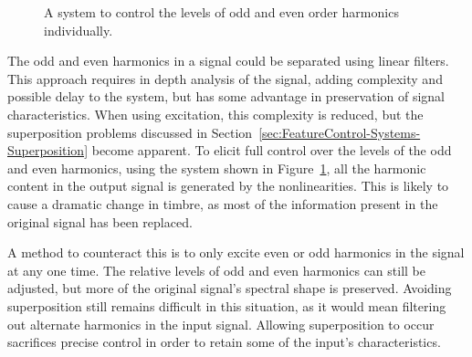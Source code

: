 \begin{figure}[h!]
			\caption{A system to control the levels of odd and even order harmonics individually.}
			\label{fig:HarmonicParitySystem}
		\end{figure}

		The odd and even harmonics in a signal could be separated using linear filters. This approach requires in
		depth analysis of the signal, adding complexity and possible delay to the system, but has some advantage in
		preservation of signal characteristics. When using excitation, this complexity is reduced, but the
		superposition problems discussed in Section~\ref{sec:FeatureControl-Systems-Superposition} become apparent.
		To elicit full control over the levels of the odd and even harmonics, using the system shown in
		Figure~\ref{fig:HarmonicParitySystem}, all the harmonic content in the output signal is generated by the
		nonlinearities. This is likely to cause a dramatic change in timbre, as most of the information present in
		the original signal has been replaced. 

		A method to counteract this is to only excite even or odd harmonics in the signal at any one time.  The
		relative levels of odd and even harmonics can still be adjusted, but more of the original signal's spectral
		shape is preserved. Avoiding superposition still remains difficult in this situation, as it would mean
		filtering out alternate harmonics in the input signal. Allowing superposition to occur sacrifices precise
		control in order to retain some of the input's characteristics.

